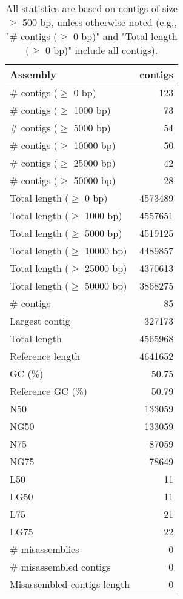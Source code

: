 \documentclass[12pt,a4paper]{article}
\begin{document}
\begin{table}[ht]
\begin{center}
\caption{All statistics are based on contigs of size $\geq$ 500 bp, unless otherwise noted (e.g., "\# contigs ($\geq$ 0 bp)" and "Total length ($\geq$ 0 bp)" include all contigs).}
\begin{tabular}{|l*{1}{|r}|}
\hline
Assembly & contigs \\ \hline
\# contigs ($\geq$ 0 bp) & 123 \\ \hline
\# contigs ($\geq$ 1000 bp) & 73 \\ \hline
\# contigs ($\geq$ 5000 bp) & 54 \\ \hline
\# contigs ($\geq$ 10000 bp) & 50 \\ \hline
\# contigs ($\geq$ 25000 bp) & 42 \\ \hline
\# contigs ($\geq$ 50000 bp) & 28 \\ \hline
Total length ($\geq$ 0 bp) & 4573489 \\ \hline
Total length ($\geq$ 1000 bp) & 4557651 \\ \hline
Total length ($\geq$ 5000 bp) & 4519125 \\ \hline
Total length ($\geq$ 10000 bp) & 4489857 \\ \hline
Total length ($\geq$ 25000 bp) & 4370613 \\ \hline
Total length ($\geq$ 50000 bp) & 3868275 \\ \hline
\# contigs & 85 \\ \hline
Largest contig & 327173 \\ \hline
Total length & 4565968 \\ \hline
Reference length & 4641652 \\ \hline
GC (\%) & 50.75 \\ \hline
Reference GC (\%) & 50.79 \\ \hline
N50 & 133059 \\ \hline
NG50 & 133059 \\ \hline
N75 & 87059 \\ \hline
NG75 & 78649 \\ \hline
L50 & 11 \\ \hline
LG50 & 11 \\ \hline
L75 & 21 \\ \hline
LG75 & 22 \\ \hline
\# misassemblies & 0 \\ \hline
\# misassembled contigs & 0 \\ \hline
Misassembled contigs length & 0 \\ \hline

\end{tabular}
\end{center}
\end{table}
\end{document}
